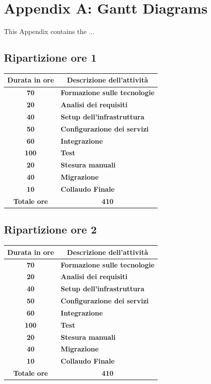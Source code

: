 \renewcommand\thechapter{A}
\chapter{Appendix A: Gantt Diagrams}
\label{AppendixA}

This Appendix contains the ...

\section{Ripartizione ore 1}

\begin{tabularx}{\textwidth}{c|X}
	\centering\textbf{Durata in ore} & \multicolumn{1}{c}{\textbf{Descrizione dell'attività}}\\\hline
	\textbf{70}&\textbf{Formazione sulle tecnologie}\\\hline
	\textbf{20}&\textbf{Analisi dei requisiti}\\\hline
	\textbf{40}&\textbf{Setup dell'infrastruttura}\\\hline
	\textbf{50}&\textbf{Configurazione dei servizi}\\\hline
	\textbf{60}&\textbf{Integrazione}\\\hline
	\textbf{100}&\textbf{Test}\\\hline
	\textbf{20}&\textbf{Stesura manuali}\\\hline
	\textbf{40}&\textbf{Migrazione}\\\hline
	\textbf{10}&\textbf{Collaudo Finale}\\\hline
	\textbf{Totale ore}&\multicolumn{1}{c}{\textbf{410}} \\	
\end{tabularx}


\section{Ripartizione ore 2}

\begin{tabularx}{\textwidth}{c|X}
	\centering\textbf{Durata in ore} & \multicolumn{1}{c}{\textbf{Descrizione dell'attività}}\\\hline
	\textbf{70}&\textbf{Formazione sulle tecnologie}\\\hline
	\textbf{20}&\textbf{Analisi dei requisiti}\\\hline
	\textbf{40}&\textbf{Setup dell'infrastruttura}\\\hline
	\textbf{50}&\textbf{Configurazione dei servizi}\\\hline
	\textbf{60}&\textbf{Integrazione}\\\hline
	\textbf{100}&\textbf{Test}\\\hline
	\textbf{20}&\textbf{Stesura manuali}\\\hline
	\textbf{40}&\textbf{Migrazione}\\\hline
	\textbf{10}&\textbf{Collaudo Finale}\\\hline
	\textbf{Totale ore}&\multicolumn{1}{c}{\textbf{410}} \\	
\end{tabularx}

